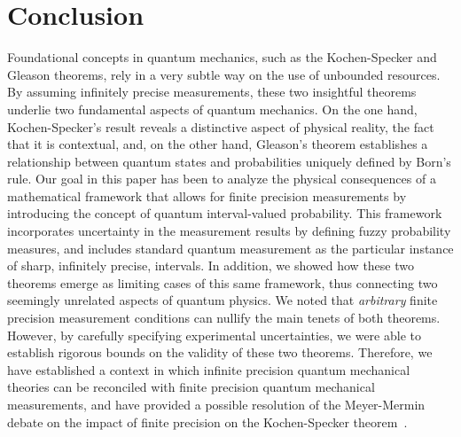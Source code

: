 \documentclass[english,reprint, aps, prl,superscriptaddress, showpacs,
showkeys, longbibliography, amsmath, amssymb, floatfix]{revtex4-1}
\theoremstyle{plain}
\theoremstyle{definition}
\begin{document}
\section{Conclusion}
\label{sec:Conclusion}
  
Foundational concepts in quantum mechanics, such as the Kochen-Specker
and Gleason theorems, rely in a very subtle way on the use of
unbounded resources. By assuming infinitely precise measurements,
these two insightful theorems underlie two fundamental aspects of
quantum mechanics. On the one hand, Kochen-Specker's result reveals a
distinctive aspect of physical reality, the fact that it is
contextual, and, on the other hand, Gleason's theorem establishes a
relationship between quantum states and probabilities uniquely defined
by Born's rule.  Our goal in this paper has been to analyze the
physical consequences of a mathematical framework that allows for
finite precision measurements by introducing the concept of quantum
interval-valued probability. This framework incorporates uncertainty
in the measurement results by defining fuzzy probability measures, and
includes standard quantum measurement as the particular instance of
sharp, infinitely precise, intervals.  In addition, we showed how
these two theorems emerge as limiting cases of this same framework,
thus connecting two seemingly unrelated aspects of quantum physics. We
noted that {\it arbitrary\/} finite precision measurement conditions
can nullify the main tenets of both theorems. However, by carefully
specifying experimental uncertainties, we were able to establish
rigorous bounds on the validity of these two theorems. Therefore, we
have established a context in which infinite precision quantum
mechanical theories can be reconciled with finite precision quantum
mechanical measurements, and have provided a possible resolution of
the Meyer-Mermin debate on the impact of finite precision on the
Kochen-Specker theorem~\cite{PhysRevLett.83.3751,Mermin1999}.



\end{document}
